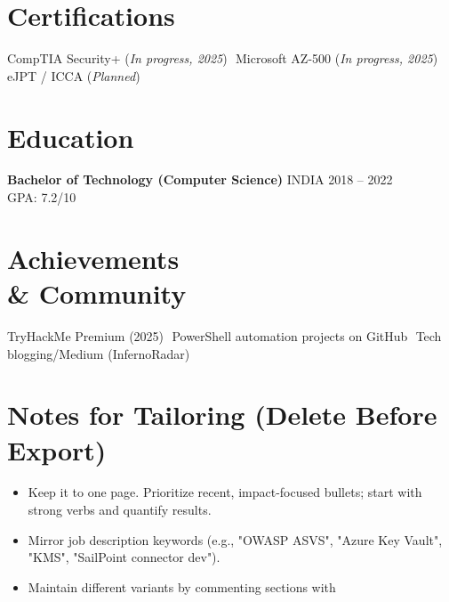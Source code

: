 \documentclass[11pt]{article}
\newcommand{\sep}{\,\textbar\,}
\newcommand{\location}[1]{\hfill {\small #1}}
\newcommand{\daterange}[1]{\hfill {\small #1}}
\begin{document}
\section*{Certifications}
CompTIA Security+ (\emph{In progress, 2025}) \sep Microsoft AZ-500 (\emph{In progress, 2025}) \\ eJPT / ICCA (\emph{Planned})

\section*{Education}
\textbf{Bachelor of Technology (Computer Science)} \location{INDIA} \daterange{2018 -- 2022}\\
GPA: 7.2/10

\section*{Achievements \\& Community}
TryHackMe Premium (2025) \sep PowerShell automation projects on GitHub \sep Tech blogging/Medium (InfernoRadar)

\section*{\footnotesize Notes for Tailoring (Delete Before Export)}
\footnotesize
\begin{itemize}
  \item Keep it to one page. Prioritize recent, impact-focused bullets; start with strong verbs and quantify results.
  \item Mirror job description keywords (e.g., "OWASP ASVS", "Azure Key Vault", "KMS", "SailPoint connector dev").
  \item Maintain different variants by commenting sections with %
\end{itemize}
\end{document}
